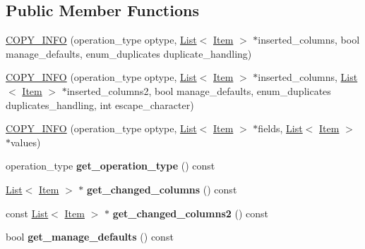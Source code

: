 \subsection*{Public Member Functions}
\begin{DoxyCompactItemize}
\item 
\mbox{\hyperlink{classCOPY__INFO_a59ba05cd9704541946914de72db0c818}{C\+O\+P\+Y\+\_\+\+I\+N\+FO}} (operation\+\_\+type optype, \mbox{\hyperlink{classList}{List}}$<$ \mbox{\hyperlink{classItem}{Item}} $>$ $\ast$inserted\+\_\+columns, bool manage\+\_\+defaults, enum\+\_\+duplicates duplicate\+\_\+handling)
\item 
\mbox{\hyperlink{classCOPY__INFO_a6b955bc13055dcedc347a75fbb4cbdee}{C\+O\+P\+Y\+\_\+\+I\+N\+FO}} (operation\+\_\+type optype, \mbox{\hyperlink{classList}{List}}$<$ \mbox{\hyperlink{classItem}{Item}} $>$ $\ast$inserted\+\_\+columns, \mbox{\hyperlink{classList}{List}}$<$ \mbox{\hyperlink{classItem}{Item}} $>$ $\ast$inserted\+\_\+columns2, bool manage\+\_\+defaults, enum\+\_\+duplicates duplicates\+\_\+handling, int escape\+\_\+character)
\item 
\mbox{\hyperlink{classCOPY__INFO_a6f301b4e25739036b3acd99a24c54257}{C\+O\+P\+Y\+\_\+\+I\+N\+FO}} (operation\+\_\+type optype, \mbox{\hyperlink{classList}{List}}$<$ \mbox{\hyperlink{classItem}{Item}} $>$ $\ast$fields, \mbox{\hyperlink{classList}{List}}$<$ \mbox{\hyperlink{classItem}{Item}} $>$ $\ast$values)
\item 
\mbox{\label{classCOPY__INFO_a63278b7b2d2cfb691c76659207eb0148}} 
operation\+\_\+type {\bfseries get\+\_\+operation\+\_\+type} () const
\item 
\mbox{\label{classCOPY__INFO_aa24704cdb5ed0c2271c1f83a3990be68}} 
\mbox{\hyperlink{classList}{List}}$<$ \mbox{\hyperlink{classItem}{Item}} $>$ $\ast$ {\bfseries get\+\_\+changed\+\_\+columns} () const
\item 
\mbox{\label{classCOPY__INFO_ad51d7c5440c5f1625dbc925e6ea865ec}} 
const \mbox{\hyperlink{classList}{List}}$<$ \mbox{\hyperlink{classItem}{Item}} $>$ $\ast$ {\bfseries get\+\_\+changed\+\_\+columns2} () const
\item 
\mbox{\label{classCOPY__INFO_afd74b742568d31e9d93b3d7812916294}} 
bool {\bfseries get\+\_\+manage\+\_\+defaults} () const
\item 

\end{DoxyCompactItemize}
